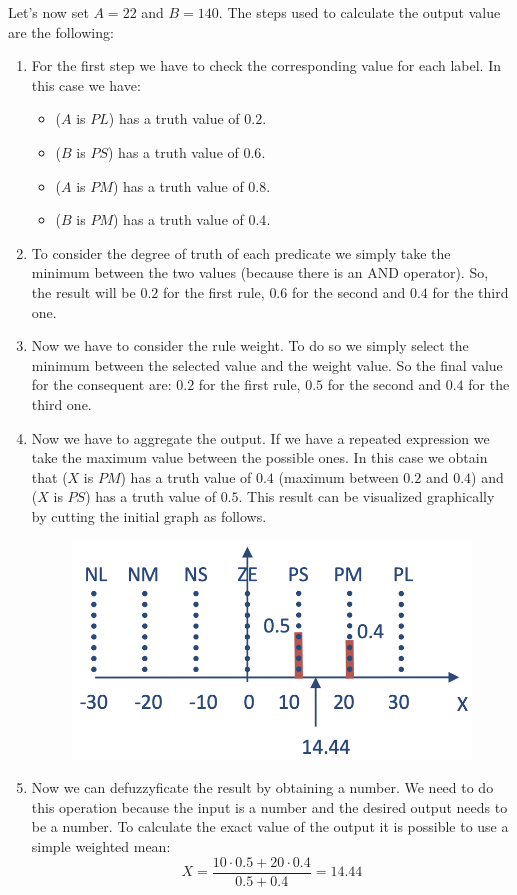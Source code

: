 \documentclass[12pt, a4paper]{report}
\theoremstyle{remark}
\begin{document}
\begin{example}
        Let's now set $A=22$ and $B=140$. The steps used to calculate the output value are the following:
        \begin{enumerate}
            \item For the first step we have to check the corresponding value for each label. In this case we have:
                \begin{itemize}
                    \item ($A$ is $PL$) has a truth value of $0.2$.
                    \item ($B$ is $PS$) has a truth value of $0.6$.
                    \item ($A$ is $PM$) has a truth value of $0.8$.
                    \item ($B$ is $PM$) has a truth value of $0.4$.
                \end{itemize}
            \item To consider the degree of truth of each predicate we simply take the minimum between the two values (because there is an AND 
                operator). So, the result will be $0.2$ for the first rule, $0.6$ for the second and $0.4$ for the third one.
            \item Now we have to consider the rule weight. To do so we simply select the minimum between the selected value and the weight value.
                So the final value for the consequent are: $0.2$ for the first rule, $0.5$ for the second and $0.4$ for the third one. 
            \item  Now we have to aggregate the output. If we have a repeated expression we take the maximum value between the possible ones. 
                In this case we obtain that ($X$ is $PM$) has a truth value of $0.4$ (maximum between $0.2$ and $0.4$) and ($X$ is $PS$) has a 
                truth value of $0.5$. This result can be visualized graphically by cutting the initial graph as follows.
                \begin{figure}[H]
                    \centering
                    \includegraphics[width=0.5\linewidth]{images/cut.png}
                \end{figure}
            \item Now we can defuzzyficate the result by obtaining a number. We need to do this operation because the input is a number and the 
            desired output needs to be a number. To calculate the exact value of the output it is possible to use a simple weighted mean: 
            \[X=\frac{10 \cdot 0.5 + 20 \cdot 0.4}{0.5+0.4}=14.44\]
        \end{enumerate}
    \end{example}
\end{document}
